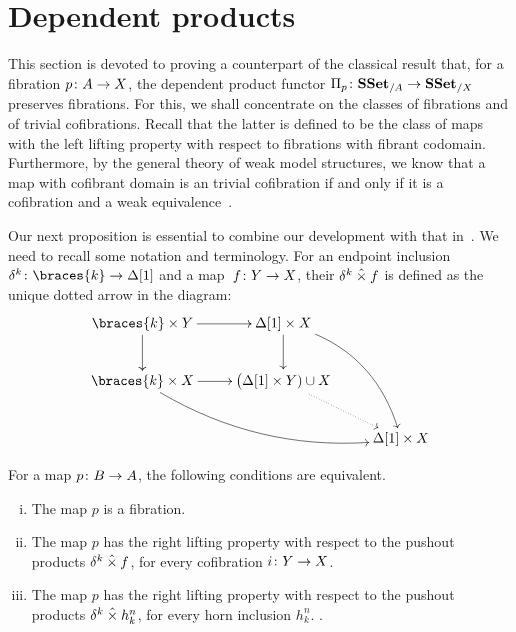 \documentclass[reqno,10pt,a4paper,oneside,draft]{amsart}
\begin{document}
\section{Dependent products}
\label{sec:Pi-types}



This section is devoted to proving a counterpart of the classical result that, for a fibration $p \colon A \rightarrow X$, the dependent product functor $\Pi_p \colon \mathbf{SSet}_{/A} \to \mathbf{SSet}_{/X}$ preserves fibrations. For this, we 
shall concentrate on the classes of fibrations and of trivial cofibrations. 
Recall that the latter is defined to be the class of maps with the left lifting property
with respect to fibrations with fibrant codomain. Furthermore, by the general theory of weak model
structures, we know that a map with cofibrant domain is an trivial cofibration if and only if it is a cofibration
and a weak equivalence~\cite[Proposition~2.2.9]{henry2018wms}.  

\medskip

Our next proposition is essential to combine our development with that in~\cite{gambino2017frobenius}.
We need to recall some notation and terminology. For an endpoint inclusion $\kcyl \co \braces{ k } \to \Delta[1]$ and a map~$f \colon Y \to X$, their $\delta^k \mathbin{\hat{\times}} f$ is defined as the unique dotted arrow  in the diagram:
\[
\xymatrix{
\braces{ k } \times Y \ar[r] \ar[d] &  \Delta[1]  \times X  \ar[d] \ar@/^1.5pc/[ddr] \\
\braces{ k} \times X \ar[r]  \ar@/_1.5pc/[drr] & \big( \Delta[1] \times Y ) \cup X \ar@{.>}[dr]  \\
 & &\Delta[1] \times  X }
 \]



\begin{proposition} For a map $p \colon B \to A$, the following conditions are equivalent.
\begin{enumerate}[(i)] 
\item The map $p$ is a fibration.
\item The map $p$ has the right lifting property with respect to the pushout products $ \delta^k  \mathbin{\hat{\times}} f$, for every cofibration $i \colon Y \to X$.
\item The map $p$ has the right lifting property with respect to the pushout products $ \delta^k  \mathbin{\hat{\times}} h^n_k$, for every  
horn inclusion $h^n_k$. .
\end{enumerate}
\end{proposition} 
\end{document}
